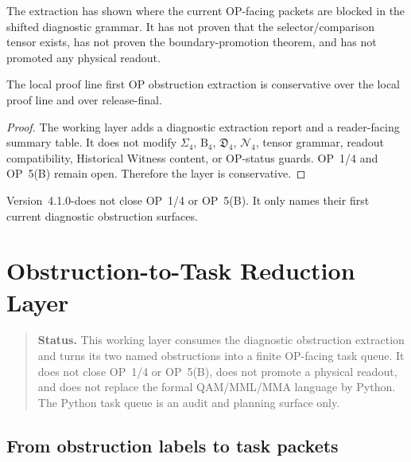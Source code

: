 \begin{remark}
\label{rem:v410r02-what-extractor-shows}
The extraction has shown where the current OP-facing packets are blocked in the
shifted diagnostic grammar. It has not proven that the selector/comparison tensor
exists, has not proven the boundary-promotion theorem, and has not promoted any
physical readout.
\end{remark}

\begin{theorem}
\label{thm:v410r02-first-obstruction-extraction-conservativity}
The local proof line first OP obstruction extraction is conservative over the local proof line
and over  release-final.
\end{theorem}

\begin{proof}
The working layer adds a diagnostic extraction report and a reader-facing
summary table. It does not modify \(\Sigma_4\), \(\mathrm B_4\),
\(\mathfrak D_4\), \(\mathcal N_4\), tensor grammar, readout compatibility,
Historical Witness content, or OP-status guards. OP~1/4 and OP~5(B) remain
open. Therefore the layer is conservative.
\end{proof}

\begin{remark}
\label{rem:v410r02-non-claim}
Version~4.1.0-does not close OP~1/4 or OP~5(B). It only names their first
current diagnostic obstruction surfaces.
\end{remark}



\clearpage
\section{Obstruction-to-Task Reduction Layer}
\label{sec:v410r03-obstruction-to-task-reduction-layer}

\begin{quote}\small
\noindent\textbf{Status.}
This working layer consumes the diagnostic obstruction extraction and turns
its two named obstructions into a finite OP-facing task queue. It does not
close OP~1/4 or OP~5(B), does not promote a physical readout, and does not
replace the formal QAM/MML/MMA language by Python. The Python task queue is an
audit and planning surface only.
\end{quote}

\subsection{From obstruction labels to task packets}
\label{subsec:v410r03-from-obstruction-labels-to-task-packets}

